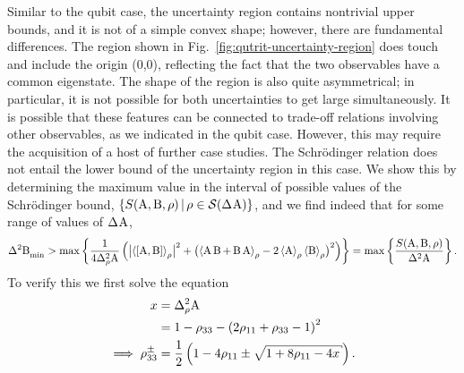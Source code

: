 Similar to the qubit case, the uncertainty region contains nontrivial upper bounds, and it is not of a simple convex shape; however, there are fundamental differences. The region shown in Fig.~\ref{fig:qutrit-uncertainty-region} does touch and include the origin (0,0), reflecting the fact that the two observables have a common eigenstate. The shape of the region is also quite asymmetrical; in particular, it is not possible for both uncertainties to get large simultaneously. It is possible that these features can be connected to trade-off relations involving other observables, as we indicated in the qubit case. However, this may require the acquisition of a host of further case studies.
The Schr\"odinger relation does not entail the lower bound of the uncertainty region in this case. %
We show this by determining the maximum value in the interval of possible values of the Schr\"odinger bound,
$\{S(\opa,\opb,\rho)\,|\, \rho\in\si(\sdev{\opa})\}$, and we find indeed that for some range of values of $\sdev{\opa}$,
\begin{equation}\label{eq:sch-uncertainty-region}%
  \varmin{\opb} > \max\left\{\frac{1}{4\varr{\opa}} \left(\bigl| \expr{\com{\opa}{\opb}} \bigr|^2
      + 
      \bigl(\expr{\acom{\opa}{\opb}}-2\expr{\opa}\expr{\opb}\bigr)^2\right)\right\}=\max\left\{\frac{S(\opa,\opb,\rho)}{\var{\opa}}\right\}.
\end{equation}
To verify this we first solve the equation
\begin{align}
  x &= \varr{\opa}\\
    &= 1 - \rho_{33} - \left(2\rho_{11} + \rho_{33} - 1\right)^2\\
  \implies \rho_{33}^\pm &= \frac{1}{2}\left(1 - 4\rho_{11} \pm\sqrt{1+8\rho_{11}-4x}\right).
\end{align}
